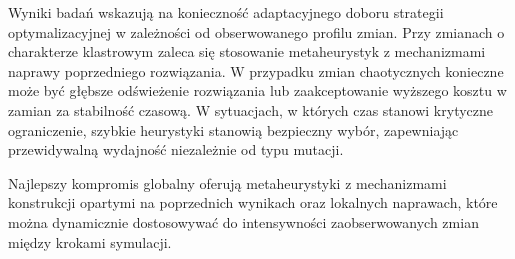 Wyniki badań wskazują na konieczność adaptacyjnego doboru strategii optymalizacyjnej w zależności od obserwowanego profilu zmian. Przy zmianach o charakterze klastrowym zaleca się stosowanie metaheurystyk z mechanizmami naprawy poprzedniego rozwiązania. W przypadku zmian chaotycznych konieczne może być głębsze odświeżenie rozwiązania lub zaakceptowanie wyższego kosztu w zamian za stabilność czasową. W sytuacjach, w których czas stanowi krytyczne ograniczenie, szybkie heurystyki stanowią bezpieczny wybór, zapewniając przewidywalną wydajność niezależnie od typu mutacji.

Najlepszy kompromis globalny oferują metaheurystyki z mechanizmami konstrukcji opartymi na poprzednich wynikach oraz lokalnych naprawach, które można dynamicznie dostosowywać do intensywności zaobserwowanych zmian między krokami symulacji.
